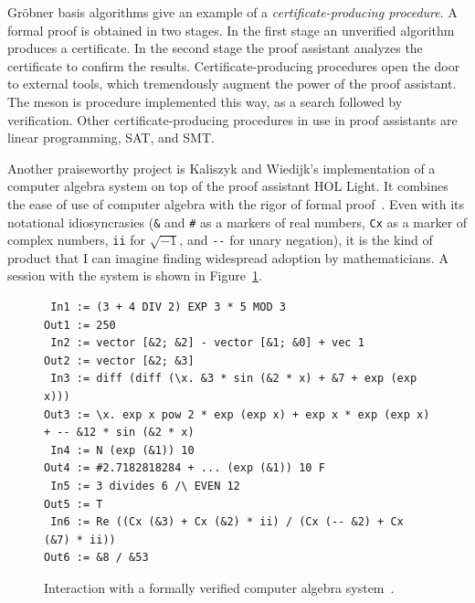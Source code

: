 \documentclass{llncs}
\begin{document}
Gr\"obner basis algorithms give an example of a {\it
  certificate-producing procedure}.  A formal proof is obtained in two
stages.  In the first stage an unverified algorithm produces a
certificate.  In the second stage the proof assistant analyzes the
certificate to confirm the results.  Certificate-producing procedures
open the door to external tools, which tremendously augment the power
of the proof assistant.  The meson is procedure implemented this way,
as a search followed by verification.  Other certificate-producing
procedures in use in proof assistants are linear programming, SAT, and
SMT.


\smallskip

Another praiseworthy project is Kaliszyk and Wiedijk's implementation
of a computer algebra system on top of the proof assistant HOL Light.
It combines the ease of use of computer algebra with the rigor of
formal proof~\cite{kaliszyk_p04_calc}.  Even with its notational
idiosyncrasies (\verb!&! and \verb!#! as a markers of real numbers,
\verb!Cx! as a marker of complex numbers, \verb!ii! for $\sqrt{-1}$,
and \verb!--! for unary negation), it is the kind of product that I
can imagine finding widespread adoption by mathematicians. A session
with the system is shown in Figure~\ref{fig:kw}.

\begin{figure}
\begin{verbatim}
 In1 := (3 + 4 DIV 2) EXP 3 * 5 MOD 3 
Out1 := 250 
 In2 := vector [&2; &2] - vector [&1; &0] + vec 1 
Out2 := vector [&2; &3] 
 In3 := diff (diff (\x. &3 * sin (&2 * x) + &7 + exp (exp x))) 
Out3 := \x. exp x pow 2 * exp (exp x) + exp x * exp (exp x) + -- &12 * sin (&2 * x) 
 In4 := N (exp (&1)) 10 
Out4 := #2.7182818284 + ... (exp (&1)) 10 F 
 In5 := 3 divides 6 /\ EVEN 12 
Out5 := T 
 In6 := Re ((Cx (&3) + Cx (&2) * ii) / (Cx (-- &2) + Cx (&7) * ii)) 
Out6 := &8 / &53 
\end{verbatim}
\caption{Interaction with a formally verified computer algebra system~\cite{kaliszyk_p04_calc}.}
\label{fig:kw}
\end{figure}


\end{document}
